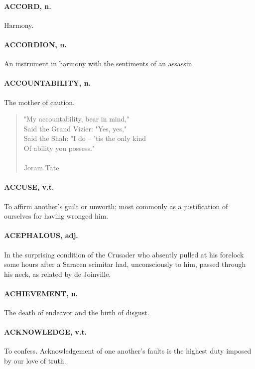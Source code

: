\documentclass[11pt]{article}
\begin{document}
\paragraph{ACCORD, n.}  Harmony.

\paragraph{ACCORDION, n.}  An instrument in harmony with the sentiments of an
assassin.

\paragraph{ACCOUNTABILITY, n.}  The mother of caution.

\begin{quote}   "My accountability, bear in mind," \\
      Said the Grand Vizier:  "Yes, yes," \\
  Said the Shah:  "I do -- 'tis the only kind \\
      Of ability you possess." \\
 \\
Joram Tate \end{quote}


\paragraph{ACCUSE, v.t.}  To affirm another's guilt or unworth; most commonly as a
justification of ourselves for having wronged him.

\paragraph{ACEPHALOUS, adj.}  In the surprising condition of the Crusader who
absently pulled at his forelock some hours after a Saracen scimitar
had, unconsciously to him, passed through his neck, as related by de
Joinville.

\paragraph{ACHIEVEMENT, n.}  The death of endeavor and the birth of disgust.

\paragraph{ACKNOWLEDGE, v.t.}  To confess.  Acknowledgement of one another's
faults is the highest duty imposed by our love of truth.
\end{document}
